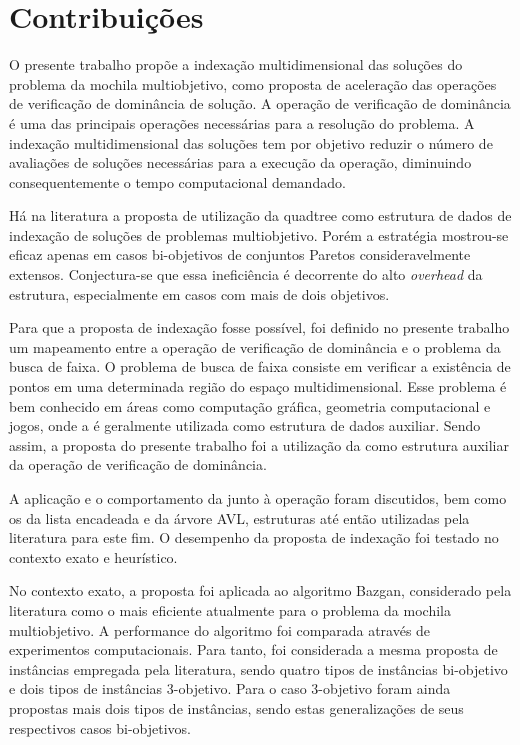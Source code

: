 \section{Contribuições}

O presente trabalho propõe a indexação multidimensional das soluções
do problema da mochila multiobjetivo,
como proposta de aceleração das operações de verificação de dominância de solução.
A operação de verificação de dominância é uma das principais
operações necessárias para a resolução do problema.
A indexação multidimensional das soluções tem por objetivo
reduzir o número de avaliações de soluções necessárias para a execução da operação,
diminuindo consequentemente o tempo computacional demandado.

Há na literatura a proposta de utilização da quadtree como estrutura de dados
de indexação de soluções de problemas multiobjetivo.
Porém a estratégia mostrou-se eficaz apenas em casos bi-objetivos de conjuntos Paretos consideravelmente extensos.
Conjectura-se que essa ineficiência é decorrente
do alto \emph{overhead} da estrutura, especialmente em casos com mais de dois objetivos.

Para que a proposta de indexação fosse possível,
foi definido no presente trabalho um mapeamento entre a operação
de verificação de dominância e o problema da busca de faixa.
O problema de busca de faixa consiste em verificar a existência de pontos em uma determinada
região do espaço multidimensional.
Esse problema é bem conhecido em áreas como computação gráfica, geometria computacional e jogos,
onde a \kdtree{} é geralmente utilizada como estrutura de dados auxiliar.
Sendo assim, a proposta do presente trabalho foi a utilização da \kdtree{}
como estrutura auxiliar da operação de verificação de dominância.

A aplicação e o comportamento da \kdtree{} junto à operação
foram discutidos, bem como os da lista encadeada e da árvore AVL,
estruturas até então utilizadas pela literatura para este fim.
O desempenho da proposta de indexação foi testado no contexto exato e heurístico.

No contexto exato, a proposta foi aplicada ao algoritmo Bazgan,
considerado pela literatura como o mais eficiente atualmente para o problema da mochila multiobjetivo.
A performance do algoritmo foi comparada através de experimentos computacionais.
Para tanto, foi considerada a mesma proposta de instâncias empregada pela literatura,
sendo quatro tipos de instâncias bi-objetivo e dois tipos de instâncias 3-objetivo.
Para o caso 3-objetivo foram ainda propostas mais dois tipos de instâncias,
sendo estas generalizações de seus respectivos casos bi-objetivos.

